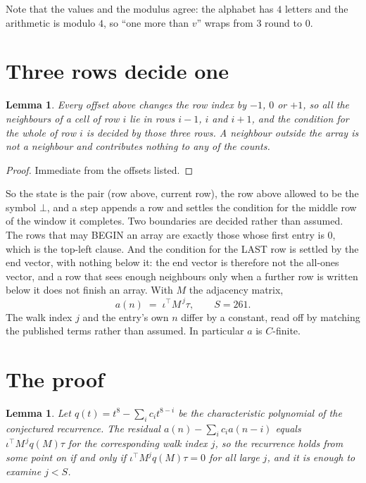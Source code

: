 \documentclass[11pt,a4paper]{article}
\theoremstyle{plain}
\newtheorem{lemma}[theorem]{Lemma}
\theoremstyle{definition}
\begin{document}
Note that the values and the modulus agree: the alphabet has $4$ letters and the arithmetic
is modulo $4$, so ``one more than $v$'' wraps from $3$ round to $0$.

\section{Three rows decide one}

\begin{lemma}\label{lem:win}
Every offset above changes the row index by $-1$, $0$ or $+1$, so all the neighbours of a cell
of row $i$ lie in rows $i-1$, $i$ and $i+1$, and the condition for the whole of row $i$ is
decided by those three rows. A neighbour outside the array is not a neighbour and contributes
nothing to any of the counts.
\end{lemma}

\begin{proof}
Immediate from the offsets listed.
\end{proof}

So the state is the pair (row above, current row), the row above allowed to be the symbol
$\bot$, and a step appends a row and settles the condition for the middle row of the window it
completes. Two boundaries are decided rather than assumed. The rows that may BEGIN an array are
exactly those whose first entry is $0$, which is the top-left clause. And the condition for the
LAST row is settled by the end vector, with nothing below it: the end vector is therefore not
the all-ones vector, and a row that sees enough neighbours only when a further row is written
below it does not finish an array. With $M$ the adjacency matrix,
\[
a(n)\;=\;\iota^{\!\top}M^{\,j}\tau ,\qquad S=261.
\]
The walk index $j$ and the entry's own $n$ differ by a constant, read off by matching the
published terms rather than assumed. In particular $a$ is $C$-finite.

\section{The proof}

\begin{lemma}\label{lem:crit}
Let $q(t)=t^{8}-\sum_i c_it^{8-i}$ be the characteristic polynomial of the
conjectured recurrence. The residual $a(n)-\sum_ic_ia(n-i)$ equals
$\iota^{\!\top}M^{\,j}q(M)\tau$ for the corresponding walk index $j$, so the recurrence
holds from some point on if and only if $\iota^{\!\top}M^{j}q(M)\tau=0$ for all large $j$,
and it is enough to examine $j<S$.
\end{lemma}
\end{document}
